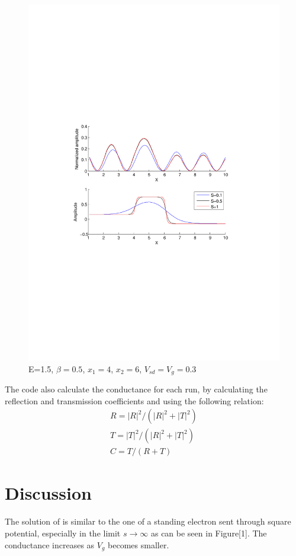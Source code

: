 \documentclass[a4paper]{article}
\begin{document}
\begin{figure}[h!]
\centering
\includegraphics[width=4.5in]{test3}
\caption{E=1.5, $\beta=0.5$, $x_1=4$, $x_2=6$, $V_{sd}=V_g=0.3$}
\label{fig:test3}
\end{figure}

The code also calculate the conductance for each run, by calculating the reflection and transmission coefficients and using the following relation:
\begin{eqnarray*}
R=|R|^2/(|R|^2+|T|^2)\\
T=|T|^2/(|R|^2+|T|^2)\\
C = T/(R+T)
\end{eqnarray*}

\section{Discussion}

The solution of is similar to the one of a standing electron sent through square potential,
especially in the limit $ s \rightarrow \infty $ as can be seen in Figure[1]. The conductance increases as $V_g$ becomes smaller.
 
\end{document}
